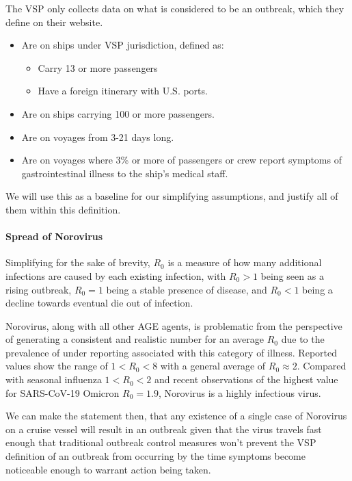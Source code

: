 \documentclass[
  11,
]{book}
\begin{document}
The VSP only collects data on what is considered to be an outbreak, which they define on their website.

\begin{itemize}
\item
  Are on ships under VSP jurisdiction, defined as:

  \begin{itemize}
  \item
    Carry 13 or more passengers
  \item
    Have a foreign itinerary with U.S. ports.
  \end{itemize}
\item
  Are on ships carrying 100 or more passengers.
\item
  Are on voyages from 3-21 days long.
\item
  Are on voyages where 3\% or more of passengers or crew report symptoms of gastrointestinal illness to the ship's medical staff.
\end{itemize}

We will use this as a baseline for our simplifying assumptions, and justify all of them within this definition.

\hypertarget{spread-of-norovirus}{%
\paragraph*{Spread of Norovirus}\label{spread-of-norovirus}}

Simplifying for the sake of brevity, \(R_0\) is a measure of how many additional infections are caused by each existing infection, with \(R_0 > 1\) being seen as a rising outbreak, \(R_0 = 1\) being a stable presence of disease, and \(R_0 < 1\) being a decline towards eventual die out of infection.

Norovirus, along with all other AGE agents, is problematic from the perspective of generating a consistent and realistic number for an average \(R_0\) due to the prevalence of under reporting associated with this category of illness. Reported values show the range of \(1 < R_0 < 8\) with a general average of \(R_0 \approx 2\). Compared with seasonal influenza \(1 < R_0 < 2\) and recent observations of the highest value for SARS-CoV-19 Omicron \(R_0 = 1.9\), Norovirus is a highly infectious virus.

We can make the statement then, that any existence of a single case of Norovirus on a cruise vessel will result in an outbreak given that the virus travels fast enough that traditional outbreak control measures won't prevent the VSP definition of an outbreak from occurring by the time symptoms become noticeable enough to warrant action being taken.
\end{document}
